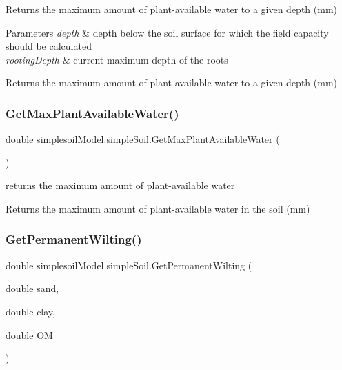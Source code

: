 Returns the maximum amount of plant-\/available water to a given depth (mm) 


\begin{DoxyParams}{Parameters}
{\em depth} & depth below the soil surface for which the field capacity should be calculated \\
\hline
{\em rooting\+Depth} & current maximum depth of the roots \\
\hline
\end{DoxyParams}
\begin{DoxyReturn}{Returns}
the maximum amount of plant-\/available water to a given depth (mm) 
\end{DoxyReturn}
\mbox{\label{classsimplesoil_model_1_1simple_soil_a1b662cb49ffb1fed83a337ce86dbebc6}} 
\subsubsection{\texorpdfstring{GetMaxPlantAvailableWater()}{GetMaxPlantAvailableWater()}}
{\footnotesize\ttfamily double simplesoil\+Model.\+simple\+Soil.\+Get\+Max\+Plant\+Available\+Water (\begin{DoxyParamCaption}{ }\end{DoxyParamCaption})\hspace{0.3cm}{\ttfamily [inline]}}



returns the maximum amount of plant-\/available water 

\begin{DoxyReturn}{Returns}
the maximum amount of plant-\/available water in the soil (mm) 
\end{DoxyReturn}
\mbox{\label{classsimplesoil_model_1_1simple_soil_aa2d3de5234f4eabc596b74af6ec7b4d2}} 
\subsubsection{\texorpdfstring{GetPermanentWilting()}{GetPermanentWilting()}}
{\footnotesize\ttfamily double simplesoil\+Model.\+simple\+Soil.\+Get\+Permanent\+Wilting (\begin{DoxyParamCaption}\item[{double}]{sand,  }\item[{double}]{clay,  }\item[{double}]{OM }\end{DoxyParamCaption})\hspace{0.3cm}{\ttfamily [inline]}}


